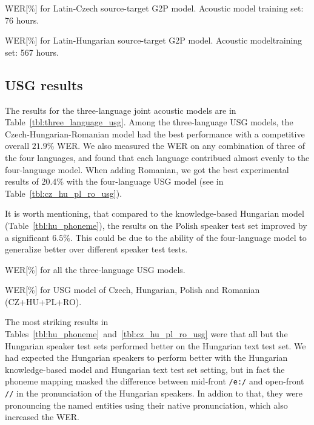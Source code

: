 \documentclass[runningheads,a4paper]{llncs}
\begin{document}
\begin{table}
\parbox{.45\linewidth}{
\centering
\caption{WER[\%] for Latin-Czech source-target G2P model. Acoustic model training set: 76 hours.}
\label{tbl:cz_phoneme}
}
\hfill
\parbox{.45\linewidth}{
\centering
\caption{WER[\%] for Latin-Hungarian source-target G2P model. Acoustic modeltraining set: 567 hours.}
\label{tbl:hu_phoneme}
}
\end{table}

\subsection{USG results}
The results for the three-language joint acoustic models are in Table~\ref{tbl:three_language_usg}.
Among the three-language USG models, the Czech-Hungarian-Romanian model had the best performance with a competitive overall $21.9\%$ WER. 
We also measured the WER on any combination of three of the four languages, and found that each language contribued almost evenly to the four-language model.
When adding Romanian, we got the best experimental results of $20.4\%$ with the four-language USG model (see in Table~\ref{tbl:cz_hu_pl_ro_usg}).

It is worth mentioning, that compared to the knowledge-based Hungarian model (Table~\ref{tbl:hu_phoneme}), the results on the Polish speaker test set improved by a significant $6.5\%$.
This could be due to the ability of the four-language model to generalize better over different speaker test tests.

\begin{table}
\parbox{.45\linewidth}{
\centering
\caption{WER[\%] for all the three-language USG models.}
\label{tbl:three_language_usg}
}
\hfill
\parbox{.45\linewidth}{
\centering
\caption{WER[\%] for USG model of Czech, Hungarian, Polish and Romanian (CZ+HU+PL+RO).}
\label{tbl:cz_hu_pl_ro_usg}
}
\end{table}
The most striking results in Tables~\ref{tbl:hu_phoneme}~and~\ref{tbl:cz_hu_pl_ro_usg} were that all but the Hungarian speaker test sets performed better on the Hungarian text test set.
We had expected the Hungarian speakers to perform better with the Hungarian knowledge-based model and Hungarian text test set setting, but in fact the phoneme mapping masked the difference between mid-front \texttt{/e:/} and open-front \texttt{//} in the pronunciation of the Hungarian speakers.
In addion to that, they were pronouncing the named entities using their native pronunciation, which also increased the WER.
\end{document}
